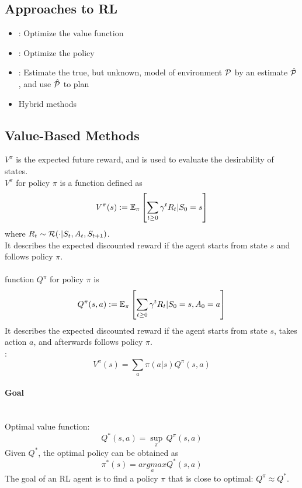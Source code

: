 \documentclass[11pt]{article}
\begin{document}
\subsection{Approaches to RL}
\begin{itemize}
	\item {}: Optimize the value function
	\item {}: Optimize the policy
	\item {}: Estimate the true, but unknown, model of environment $\mathcal{P}$ by an estimate $\hat{\mathcal{P}}$, and use $\hat{\mathcal{P}}$ to plan
	\item Hybrid methods
\end{itemize}



\subsection{Value-Based Methods}

 $V^\pi$ is the expected future reward, and is used to evaluate the desirability of states. \\
 $V^\pi$ for policy $\pi$ is a function defined as
$$V^{\pi}(s) := \mathbb{E}_\pi\left[ \sum_{t \geq 0} \gamma^t R_t | S_0=s \right ]$$ where $R_t \sim \mathcal{R}(\cdot | S_t, A_t, S_{t+1})$.\\
It describes the expected discounted reward if the agent starts from state $s$ and follows policy $\pi$.\\
\\
 function $Q^\pi$ for policy $\pi$ is 
$$Q^\pi(s,a) := \mathbb{E}_\pi\left[ \sum_{t \geq 0} \gamma^tR_t | S_0=s, A_0 = a\right ]$$
It describes the expected discounted reward if the agent starts from state $s$, takes action $a$, and afterwards follows policy $\pi$. \\
: $$V^\pi(s) = \sum_{a}\pi(a|s)Q^\pi(s,a)$$


\paragraph{Goal} 
 \\
Optimal value function:
$$Q^*(s,a) = \underset{\pi}{\sup} \, Q^\pi (s,a)$$
Given $Q^*$, the optimal policy can be obtained as 
$$\pi^*(s) = \underset{a}{argmax}Q^*(s,a)$$
The goal of an RL agent is to find a policy $\pi$ that is close to optimal: $Q^\pi \approx Q^*$.
\end{document}
